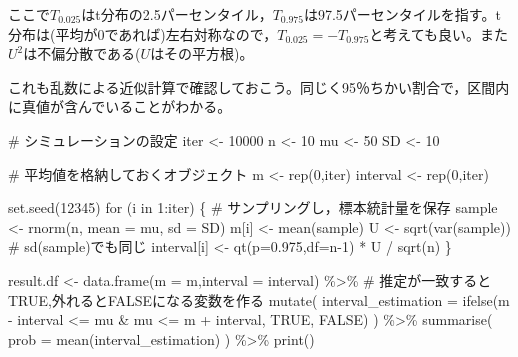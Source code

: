 \documentclass[
  a4paper,
]{ltjsbook}
\newenvironment{Shaded}{\begin{snugshade}}{\end{snugshade}}
\newcommand{\AttributeTok}[1]{\textcolor[rgb]{0.40,0.45,0.13}{#1}}
\newcommand{\CommentTok}[1]{\textcolor[rgb]{0.37,0.37,0.37}{#1}}
\newcommand{\ConstantTok}[1]{\textcolor[rgb]{0.56,0.35,0.01}{#1}}
\newcommand{\ControlFlowTok}[1]{\textcolor[rgb]{0.00,0.23,0.31}{#1}}
\newcommand{\DecValTok}[1]{\textcolor[rgb]{0.68,0.00,0.00}{#1}}
\newcommand{\FloatTok}[1]{\textcolor[rgb]{0.68,0.00,0.00}{#1}}
\newcommand{\FunctionTok}[1]{\textcolor[rgb]{0.28,0.35,0.67}{#1}}
\newcommand{\NormalTok}[1]{\textcolor[rgb]{0.00,0.23,0.31}{#1}}
\newcommand{\OtherTok}[1]{\textcolor[rgb]{0.00,0.23,0.31}{#1}}
\newcommand{\SpecialCharTok}[1]{\textcolor[rgb]{0.37,0.37,0.37}{#1}}
\begin{document}
ここで\(T_{0.025}\)はt分布の2.5パーセンタイル，\(T_{0.975}\)は97.5パーセンタイルを指す。t分布は(平均が0であれば)左右対称なので，\(T_{0.025}=-T_{0.975}\)と考えても良い。また\(U^2\)は不偏分散である(\(U\)はその平方根)。

これも乱数による近似計算で確認しておこう。同じく95％ちかい割合で，区間内に真値が含んでいることがわかる。

\begin{Shaded}
\begin{Highlighting}[]
\CommentTok{\# シミュレーションの設定}
\NormalTok{iter }\OtherTok{\textless{}{-}} \DecValTok{10000}
\NormalTok{n }\OtherTok{\textless{}{-}} \DecValTok{10}
\NormalTok{mu }\OtherTok{\textless{}{-}} \DecValTok{50}
\NormalTok{SD }\OtherTok{\textless{}{-}} \DecValTok{10}

\CommentTok{\# 平均値を格納しておくオブジェクト}
\NormalTok{m }\OtherTok{\textless{}{-}} \FunctionTok{rep}\NormalTok{(}\DecValTok{0}\NormalTok{,iter)}
\NormalTok{interval }\OtherTok{\textless{}{-}} \FunctionTok{rep}\NormalTok{(}\DecValTok{0}\NormalTok{,iter)}

\FunctionTok{set.seed}\NormalTok{(}\DecValTok{12345}\NormalTok{)}
\ControlFlowTok{for}\NormalTok{ (i }\ControlFlowTok{in} \DecValTok{1}\SpecialCharTok{:}\NormalTok{iter) \{}
  \CommentTok{\# サンプリングし，標本統計量を保存}
\NormalTok{  sample }\OtherTok{\textless{}{-}} \FunctionTok{rnorm}\NormalTok{(n, }\AttributeTok{mean =}\NormalTok{ mu, }\AttributeTok{sd =}\NormalTok{ SD)}
\NormalTok{  m[i] }\OtherTok{\textless{}{-}} \FunctionTok{mean}\NormalTok{(sample)}
\NormalTok{  U }\OtherTok{\textless{}{-}} \FunctionTok{sqrt}\NormalTok{(}\FunctionTok{var}\NormalTok{(sample)) }\CommentTok{\# sd(sample)でも同じ}
\NormalTok{  interval[i] }\OtherTok{\textless{}{-}} \FunctionTok{qt}\NormalTok{(}\AttributeTok{p=}\FloatTok{0.975}\NormalTok{,}\AttributeTok{df=}\NormalTok{n}\DecValTok{{-}1}\NormalTok{) }\SpecialCharTok{*}\NormalTok{ U }\SpecialCharTok{/} \FunctionTok{sqrt}\NormalTok{(n)}
\NormalTok{\}}

\NormalTok{result.df }\OtherTok{\textless{}{-}} \FunctionTok{data.frame}\NormalTok{(}\AttributeTok{m =}\NormalTok{ m,}\AttributeTok{interval =}\NormalTok{ interval) }\SpecialCharTok{\%\textgreater{}\%}
  \CommentTok{\# 推定が一致するとTRUE,外れるとFALSEになる変数を作る}
  \FunctionTok{mutate}\NormalTok{(}
    \AttributeTok{interval\_estimation =} \FunctionTok{ifelse}\NormalTok{(m }\SpecialCharTok{{-}}\NormalTok{ interval }\SpecialCharTok{\textless{}=}\NormalTok{ mu }\SpecialCharTok{\&}\NormalTok{ mu }\SpecialCharTok{\textless{}=}\NormalTok{ m }\SpecialCharTok{+}\NormalTok{ interval, }\ConstantTok{TRUE}\NormalTok{, }\ConstantTok{FALSE}\NormalTok{)}
\NormalTok{  ) }\SpecialCharTok{\%\textgreater{}\%} 
  \FunctionTok{summarise}\NormalTok{(}
    \AttributeTok{prob =} \FunctionTok{mean}\NormalTok{(interval\_estimation)}
\NormalTok{  ) }\SpecialCharTok{\%\textgreater{}\%} \FunctionTok{print}\NormalTok{()}
\end{Highlighting}
\end{Shaded}
\end{document}
